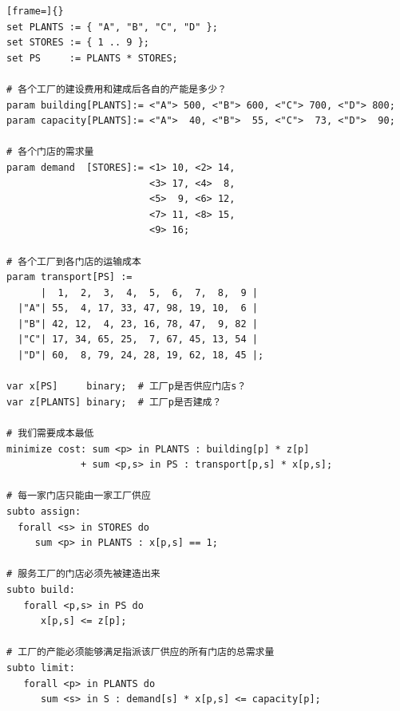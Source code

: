 \clearpage
{}
\begin{lstlisting}[frame=]{}
set PLANTS := { "A", "B", "C", "D" };
set STORES := { 1 .. 9 };
set PS     := PLANTS * STORES;

# 各个工厂的建设费用和建成后各自的产能是多少？
param building[PLANTS]:= <"A"> 500, <"B"> 600, <"C"> 700, <"D"> 800;
param capacity[PLANTS]:= <"A">  40, <"B">  55, <"C">  73, <"D">  90;

# 各个门店的需求量
param demand  [STORES]:= <1> 10, <2> 14,
                         <3> 17, <4>  8,
                         <5>  9, <6> 12,
                         <7> 11, <8> 15,
                         <9> 16;

# 各个工厂到各门店的运输成本
param transport[PS] :=
      |  1,  2,  3,  4,  5,  6,  7,  8,  9 |
  |"A"| 55,  4, 17, 33, 47, 98, 19, 10,  6 |
  |"B"| 42, 12,  4, 23, 16, 78, 47,  9, 82 |
  |"C"| 17, 34, 65, 25,  7, 67, 45, 13, 54 |
  |"D"| 60,  8, 79, 24, 28, 19, 62, 18, 45 |;

var x[PS]     binary;  # 工厂p是否供应门店s？
var z[PLANTS] binary;  # 工厂p是否建成？

# 我们需要成本最低
minimize cost: sum <p> in PLANTS : building[p] * z[p]
             + sum <p,s> in PS : transport[p,s] * x[p,s];

# 每一家门店只能由一家工厂供应
subto assign:
  forall <s> in STORES do
     sum <p> in PLANTS : x[p,s] == 1;

# 服务工厂的门店必须先被建造出来
subto build:
   forall <p,s> in PS do
      x[p,s] <= z[p];

# 工厂的产能必须能够满足指派该厂供应的所有门店的总需求量
subto limit:
   forall <p> in PLANTS do
      sum <s> in S : demand[s] * x[p,s] <= capacity[p];
\end{lstlisting}


